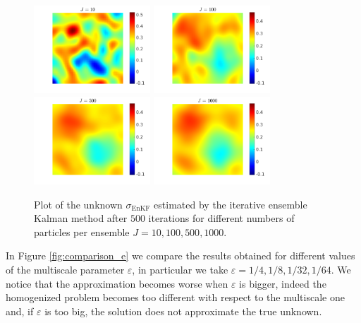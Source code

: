 \documentclass[10pt]{article}
\begin{document}
\begin{figure}[t]
\centering
\includegraphics[width = 0.39\textwidth]{figures/ensemble_500_J10}
\includegraphics[width = 0.39\textwidth]{figures/ensemble_500_J100}
\\
\includegraphics[width = 0.39\textwidth]{figures/ensemble_500_J500}
\includegraphics[width = 0.39\textwidth]{figures/ensemble_500_J1000}
\caption{Plot of the unknown $\sigma_{\mathrm{EnKF}}$ estimated by the iterative ensemble Kalman method after $500$ iterations for different numbers of particles per ensemble $J = 10, 100, 500, 1000$.}
\label{fig:comparison_J}
\end{figure}

In Figure \ref{fig:comparison_e} we compare the results obtained for different values of the multiscale parameter $\varepsilon$, in particular we take $\varepsilon = 1/4, 1/8, 1/32, 1/64$. We notice that the approximation becomes worse when $\varepsilon$ is bigger, indeed the homogenized problem becomes too different with respect to the multiscale one and, if $\varepsilon$ is too big, the solution does not approximate the true unknown.
\end{document}
